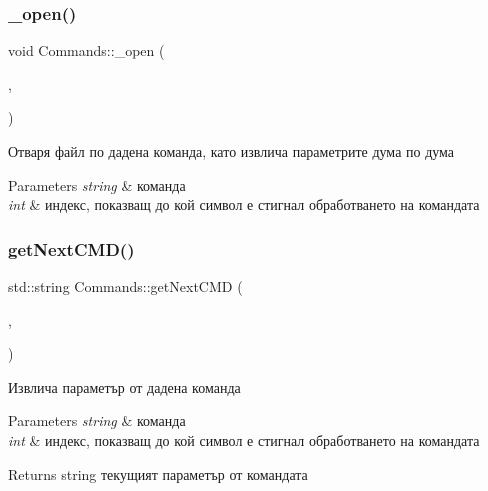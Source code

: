 \subsubsection{\texorpdfstring{\+\_\+open()}{\_open()}}
{\footnotesize\ttfamily void Commands\+::\+\_\+open (\begin{DoxyParamCaption}\item[{std\+::string \&}]{,  }\item[{int \&}]{ }\end{DoxyParamCaption})\hspace{0.3cm}{\ttfamily [private]}}



Отваря файл по дадена команда, като извлича параметрите дума по дума 


\begin{DoxyParams}{Parameters}
{\em string} & команда \\
\hline
{\em int} & индекс, показващ до кой символ е стигнал обработването на командата \\
\hline
\end{DoxyParams}
\mbox{\label{class_commands_ad3d2136d6f9d46f62513fba7454b980f}} 
\subsubsection{\texorpdfstring{get\+Next\+C\+M\+D()}{getNextCMD()}}
{\footnotesize\ttfamily std\+::string Commands\+::get\+Next\+C\+MD (\begin{DoxyParamCaption}\item[{std\+::string \&}]{,  }\item[{int \&}]{ }\end{DoxyParamCaption})\hspace{0.3cm}{\ttfamily [private]}}



Извлича параметър от дадена команда 


\begin{DoxyParams}{Parameters}
{\em string} & команда \\
\hline
{\em int} & индекс, показващ до кой символ е стигнал обработването на командата \\
\hline
\end{DoxyParams}
\begin{DoxyReturn}{Returns}
string текущият параметър от командата 
\end{DoxyReturn}
\mbox{\label{class_commands_aa9562e12c94ab654035a1c08bc04f377}} 
